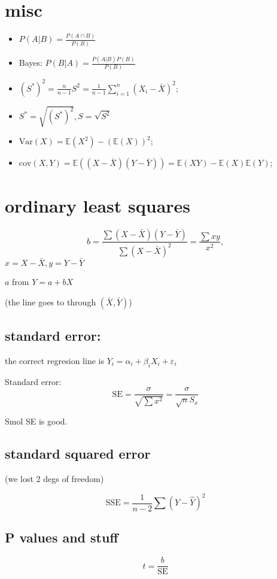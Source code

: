 \documentclass[11pt]{article}
\date{\today}
\title{}
\begin{document}
\section*{misc}
\label{sec:orgb709a65}
\begin{itemize}
\item \(P(A|B) = \frac {P(A \cap B)}{P(B)}\)
\item Bayes: \(P(B|A) = \frac {P(A|B) P(B)}{P(B)}\)
\item \(\displaystyle (S^*)^2 = \frac{n}{n-1} S^2 = \frac{1}{n-1} \sum_{i=1}^{n} (X_i- \bar{X})^2\);
\item \(S^* = \sqrt{(S^*)^2}, S = \sqrt{S^2}\)
\item \(\mathrm{Var}(X) = \mathbb{E}(X^2) - \left(\mathbb{E}(X)\right)^2\);

\item \(\mathrm{cov}(X, Y) = \mathbb{E}\left(( X - \bar{X}  ) (Y - \bar{Y}) \right) = \mathbb{E}(XY) - \mathbb{E}(X)\mathbb{E}(Y)\);
\end{itemize}
\section*{ordinary least squares}
\label{sec:org03964bf}

\[ b  = \frac{\sum(X-\bar{X})(Y-\bar{Y})}{\sum(X-\bar{X})^2} = \frac{\sum xy}{x^2}, \]
\(x =X-\bar{X}, y =Y-\bar{Y}\)

\(a\) from \(Y=a + bX\)

(the line goes to through \((\bar{X}, \bar{Y})\))

\subsection*{standard error:}
\label{sec:orgba9ccd2}
the correct regresion line is \(Y_i = \alpha_i+\beta_i X_i + \varepsilon_i\)

Standard error:
\[ \mathrm{SE} = \frac{\sigma }{\sqrt{\sum x^2}} = \frac{\sigma}{\sqrt{n} S_x} \]

Smol SE is good.

\subsection*{standard squared error}
\label{sec:org8f4f4fe}
(we lost 2 degs of freedom)

\[ \mathrm{SSE} = \frac{1}{n-2} \sum (Y-\hat{Y})^2 \]


\subsection*{P values and stuff}
\label{sec:org1ec6588}
\[ t = \frac{b}{\mathrm{SE}} \]
\end{document}
